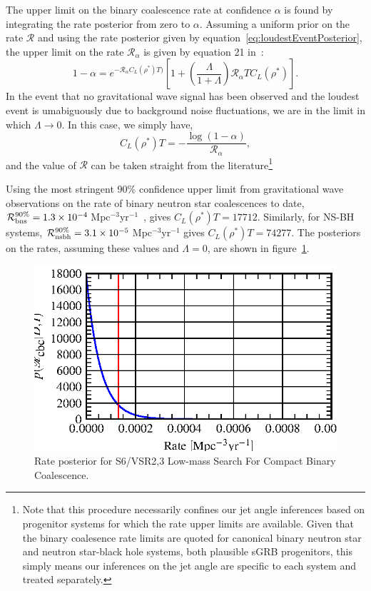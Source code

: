 \documentclass[twocolumn,nofootinbib]{revtex4}
\newcommand{\gw}{gravitational wave }
\newcommand{\cbcrate}{{{\mathcal R}}}
\newcommand{\rhostar}{{\rho^*}}
\begin{document}
The upper limit on the binary coalescence rate at confidence $\alpha$ is found
by integrating the rate posterior from zero to $\alpha$.  Assuming a uniform
prior on the rate $\cbcrate$ and using the rate posterior given by
equation~\ref{eq:loudestEventPosterior}, the upper limit on the rate
$\cbcrate_{\alpha}$ is given by equation 21 in~\cite{BradyFairhurst08}:
%
\begin{equation}
1-\alpha =  e^{-\cbcrate_{\alpha} C_L(\rhostar)T)}
\left[ 
1+ \left(\frac{\Lambda}{1+\Lambda}\right) \cbcrate_{\alpha} T C_L(\rhostar)
\right ].
\label{eq:rateIntegral}
\end{equation}
%
In the event that no \gw signal has been observed and the loudest event is
umabiguously due to background noise fluctuations, we are in the limit in which
$\Lambda \rightarrow 0$.  In this case, we simply have,
\begin{equation}
C_L(\rhostar)T = -\frac{\log(1-\alpha)}{\cbcrate_{\alpha}},
\end{equation}
%
and the value of $\cbcrate$ can be taken straight from the literature\footnote{Note
that this procedure necessarily confines our jet angle inferences based on
progenitor systems for which the rate upper limits are available.  Given that
the binary coalesence rate limits are quoted for canonical binary neutron star
and neutron star-black hole systems, both plausible sGRB progenitors, this
simply means our inferences on the jet angle are specific to each system and
treated separately.}

Using the most stringent 90\% confidence upper limit from \gw observations on
the rate of binary neutron star coalescences to date, $\cbcrate^{90\%}_{{\rm
bns}} = 1.3\times 10^{-4}$\,Mpc$^{-3}$yr$^{-1}$~\cite{S6lowmass}, gives
$C_L(\rhostar)T=17712$.  Similarly, for NS-BH systems,  $\cbcrate^{90\%}_{{\rm
nsbh}} = 3.1\times 10^{-5}$\,Mpc$^{-3}$yr$^{-1}$ gives $C_L(\rhostar)T=74277$.
The posteriors on the rates, assuming these values and $\Lambda=0$, are shown in
figure~\ref{fig:reconstructedRatePosterior}.  

\begin{figure}
\includegraphics{rate_posterior_s6UL.eps}
\caption{Rate posterior for S6/VSR2,3 Low-mass Search For Compact Binary
Coalescence.\label{fig:reconstructedRatePosterior}}
\end{figure}
\end{document}
